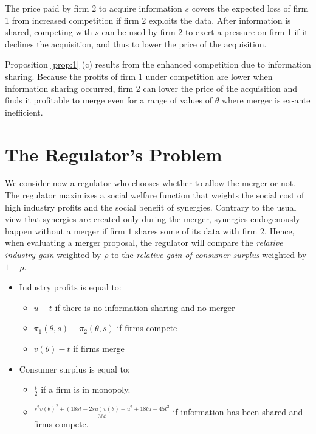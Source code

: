 \documentclass[a4paper,leqno]{article}%
\renewcommand{\t}{\theta}
\begin{document}
\medskip

The price paid by firm 2 to acquire information $s$ covers the expected loss of firm 1 from increased competition if firm 2 exploits the data. After information is shared, competing with $s$ can be used by firm 2 to exert a pressure on firm 1 if it declines the acquisition, and thus to lower the price of the acquisition. 

\medskip

Proposition \ref{prop:1} (c) results from the enhanced competition due to information sharing. Because the profits of firm 1 under competition are lower when information sharing occurred, firm 2 can lower the price of the acquisition and finds it profitable to merge even for a range of values of $\t$ where merger is ex-ante inefficient.

\medskip

\section{The Regulator's Problem}

We consider now a regulator who chooses whether to allow the merger or not. The regulator maximizes a social welfare function that weights the social cost of high industry profits and the social benefit of synergies. Contrary to the usual view that synergies are created only during the merger, synergies endogenously happen without a merger if firm $1$ shares some of its data with firm $2$. Hence, when evaluating a merger proposal, the regulator will compare the \emph{relative industry gain} weighted by $\rho$ to the \emph{relative gain of consumer surplus} weighted by $1-\rho$.


\begin{itemize}
    \item Industry profits is equal to:
    \begin{itemize}
        \item $u-t$ if there is no information sharing and no merger
        \item $\pi_1(\t,s)+\pi_2(\t,s)$ if firms compete
        \item $v(\t)-t$ if firms merge
    \end{itemize}
    \item Consumer surplus is equal to:
    \begin{itemize}
        \item $\frac{t}{2}$ if a firm is in monopoly.
        \item $\frac{s^2v(\t)^2+(18st-2su)v(\t)+u^2+18tu-45t^2}{36t}$ if information has been shared and firms compete.
    \end{itemize}
\end{itemize}
\end{document}
